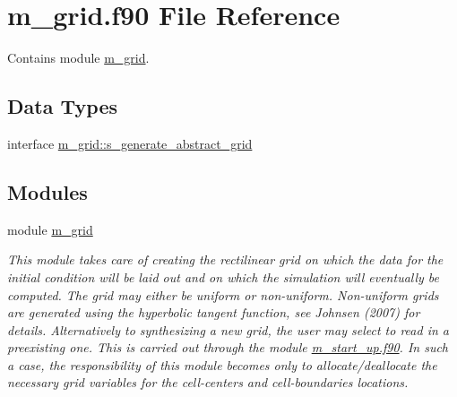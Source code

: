 \hypertarget{m__grid_8f90}{}\section{m\+\_\+grid.\+f90 File Reference}
\label{m__grid_8f90}


Contains module \hyperlink{namespacem__grid}{m\+\_\+grid}.  


\subsection*{Data Types}
\begin{DoxyCompactItemize}
\item 
interface \hyperlink{interfacem__grid_1_1s__generate__abstract__grid}{m\+\_\+grid\+::s\+\_\+generate\+\_\+abstract\+\_\+grid}
\end{DoxyCompactItemize}
\subsection*{Modules}
\begin{DoxyCompactItemize}
\item 
module \hyperlink{namespacem__grid}{m\+\_\+grid}
\begin{DoxyCompactList}\small\item\em This module takes care of creating the rectilinear grid on which the data for the initial condition will be laid out and on which the simulation will eventually be computed. The grid may either be uniform or non-\/uniform. Non-\/uniform grids are generated using the hyperbolic tangent function, see Johnsen (2007) for details. Alternatively to synthesizing a new grid, the user may select to read in a preexisting one. This is carried out through the module \hyperlink{m__start__up_8f90}{m\+\_\+start\+\_\+up.\+f90}. In such a case, the responsibility of this module becomes only to allocate/deallocate the necessary grid variables for the cell-\/centers and cell-\/boundaries locations. \end{DoxyCompactList}\end{DoxyCompactItemize}
